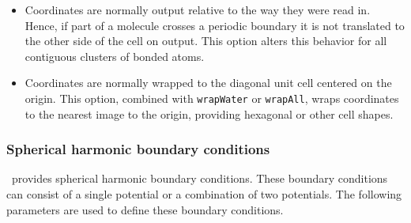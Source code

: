 \begin{itemize}
\item
{}
{Coordinates are normally output relative to the way they were read in.  Hence, if part of a molecule crosses a periodic boundary it is not translated to the other side of the cell on output.  This option alters this behavior for all contiguous clusters of bonded atoms.}

\item
{}
{Coordinates are normally wrapped to the diagonal unit cell centered on the origin.  This option, combined with {\tt wrapWater} or {\tt wrapAll}, wraps coordinates to the nearest image to the origin, providing hexagonal or other cell shapes.}

\end{itemize}


\subsubsection{Spherical harmonic boundary conditions}

\NAMD\ provides spherical harmonic boundary conditions.  These 
boundary conditions can consist of a single potential or a 
combination of two potentials.
The following parameters are used to define these boundary conditions.  

